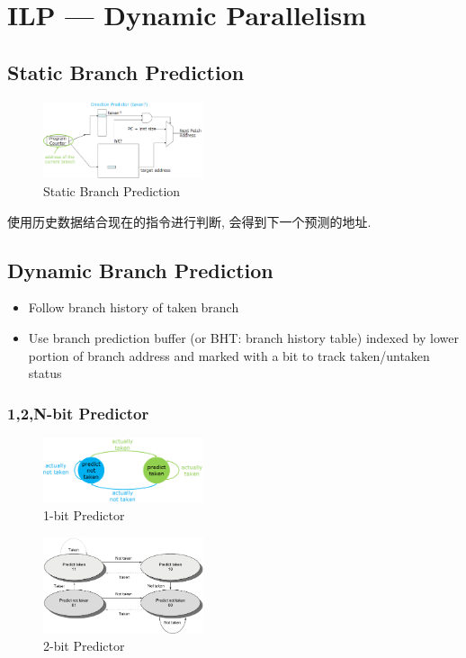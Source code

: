 \newpage
\section{ILP --- Dynamic Parallelism}

\subsection{Static Branch Prediction}
\begin{figure}[!htb]
    \centering
    \includegraphics[width=0.42\textwidth]{pic/CA3/Static Branch Prediction}
    \caption{Static Branch Prediction}
\end{figure}

使用历史数据结合现在的指令进行判断, 会得到下一个预测的地址. 
\subsection{Dynamic Branch Prediction}
\begin{itemize}
    \item Follow branch history of taken branch
    \item Use branch prediction buffer (or BHT: branch history table) indexed by lower portion of branch address and marked with a bit to track taken/untaken status
\end{itemize}

\subsubsection{1,2,N-bit Predictor}
\begin{figure}[!htb]
    \centering
    \includegraphics[width=0.42\textwidth]{pic/CA3/1-bit Predictor}
    \caption{1-bit Predictor}
\end{figure}

\begin{figure}[!htb]
    \centering
    \includegraphics[width=0.42\textwidth]{pic/CA3/2-bit Predictor}
    \caption{2-bit Predictor}
\end{figure}

